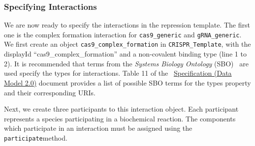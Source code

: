 \subsubsection*{Specifying Interactions}
We are now ready to specify the interactions in the repression template. The first one is the complex formation interaction for \lstinline+cas9_generic+ and \lstinline+gRNA_generic+. We first create an  object \lstinline+cas9_complex_formation+ in \lstinline+CRISPR_Template+, with the displayId ``cas9\_complex\_formation'' and a non-covalent binding type (line 1 to 2). It is recommended that terms from the \emph{Systems Biology Ontology} (SBO)~\cite{Courtot2011} are used specify the types for interactions. Table 11 of the ~\href{http://sbolstandard.org/downloads/specification-data-model-2-0/}{Specification  (Data Model 2.0)} document provides a list of possible SBO terms for the types property and their corresponding URIs. 

Next, we create three participants to this interaction object. Each participant represents a species participating in a biochemical reaction. The components which participate in an interaction must be assigned using the \lstinline+participate+method.

